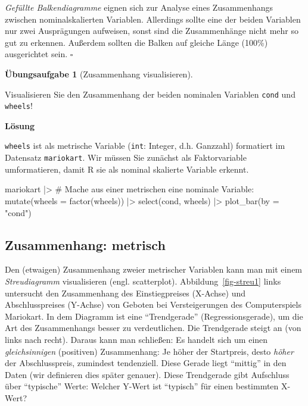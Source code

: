 \documentclass[
  letterpaper,
]{scrbook}
\newenvironment{Shaded}{\begin{snugshade}}{\end{snugshade}}
\newcommand{\AttributeTok}[1]{\textcolor[rgb]{0.40,0.45,0.13}{#1}}
\newcommand{\CommentTok}[1]{\textcolor[rgb]{0.37,0.37,0.37}{#1}}
\newcommand{\FunctionTok}[1]{\textcolor[rgb]{0.28,0.35,0.67}{#1}}
\newcommand{\NormalTok}[1]{\textcolor[rgb]{0.00,0.23,0.31}{#1}}
\newcommand{\SpecialCharTok}[1]{\textcolor[rgb]{0.37,0.37,0.37}{#1}}
\newcommand{\StringTok}[1]{\textcolor[rgb]{0.13,0.47,0.30}{#1}}
\theoremstyle{definition}
\newtheorem{exercise}{Übungsaufgabe}[chapter]
\theoremstyle{definition}
\theoremstyle{definition}
\theoremstyle{remark}
\begin{document}
\emph{Gefüllte Balkendiagramme} eignen sich zur Analyse eines
Zusammenhangs zwischen nominalskalierten Variablen. Allerdings sollte
eine der beiden Variablen nur zwei Ausprägungen aufweisen, sonst sind
die Zusammenhänge nicht mehr so gut zu erkennen. Außerdem sollten die
Balken auf gleiche Länge (100\%) ausgerichtet sein. \(\square\)

\begin{exercise}[Zusammenhang
visualisieren]\protect\hypertarget{exr-zsmnhang-cond-wheels}{}\label{exr-zsmnhang-cond-wheels}

Visualisieren Sie den Zusammenhang der beiden nominalen Variablen
\texttt{cond} und \texttt{wheels}!

\textbf{Lösung}

\texttt{wheels} ist als metrische Variable (\texttt{int}: Integer, d.h.
Ganzzahl) formatiert im Datensatz \texttt{mariokart}. Wir müssen Sie
zunächst als Faktorvariable umformatieren, damit R sie als nominal
skalierte Variable erkennt.

\begin{Shaded}
\begin{Highlighting}[]
\NormalTok{mariokart }\SpecialCharTok{|\textgreater{}} 
  \CommentTok{\# Mache aus einer metrischen eine nominale Variable: }
  \FunctionTok{mutate}\NormalTok{(}\AttributeTok{wheels =} \FunctionTok{factor}\NormalTok{(wheels)) }\SpecialCharTok{|\textgreater{}} 
  \FunctionTok{select}\NormalTok{(cond, wheels) }\SpecialCharTok{|\textgreater{}} 
  \FunctionTok{plot\_bar}\NormalTok{(}\AttributeTok{by =} \StringTok{"cond"}\NormalTok{)}
\end{Highlighting}
\end{Shaded}

\end{exercise}

\subsection{Zusammenhang: metrisch}\label{sec-zshg-metr}

Den (etwaigen) Zusammenhang zweier metrischer Variablen kann man mit
einem \emph{Streudiagramm} visualisieren (engl. scatterplot).
Abbildung~\ref{fig-streu1} links untersucht den Zusammenhang des
Einstiegpreises (X-Achse) und Abschlusspreises (Y-Achse) von Geboten bei
Versteigerungen des Computerspiels Mariokart. In dem Diagramm ist eine
\enquote{Trendgerade} (Regressionsgerade), um die Art des Zusammenhangs
besser zu verdeutlichen. Die Trendgerade steigt an (von links nach
recht). Daraus kann man schließen: Es handelt sich um einen
\emph{gleichsinnigen} (positiven) Zusammenhang: Je höher der Startpreis,
desto \emph{höher} der Abschlusspreis, zumindest tendenziell. Diese
Gerade liegt \enquote{mittig} in den Daten (wir definieren dies später
genauer). Diese Trendgerade gibt Aufschluss über \enquote{typische}
Werte: Welcher Y-Wert ist \enquote{typisch} für einen bestimmten X-Wert?
\end{document}
